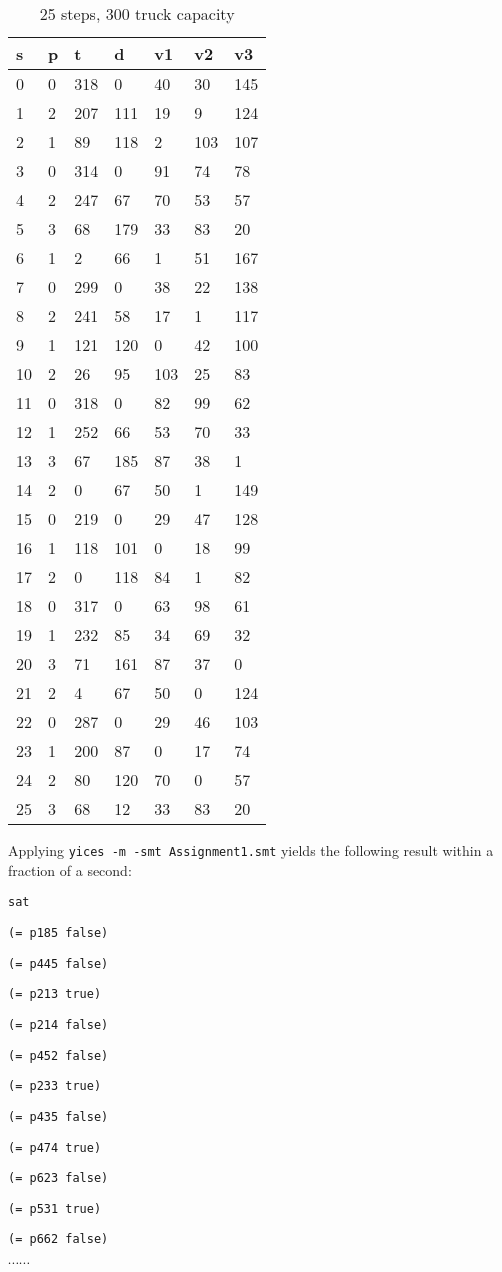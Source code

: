\documentclass[a4paper]{article}
\begin{document}
	\begin{longtable}[c]{@{}|l|l|l|l|l|l|l|@{}}
		\caption{25 steps, 300 truck capacity}\\
		\toprule
		s & p & t & d & v1 & v2 & v3\tabularnewline
		\midrule
		\endhead
		0 & 0 & 318 & 0 & 40 & 30 & 145\tabularnewline
		1 & 2 & 207 & 111 & 19 & 9 & 124\tabularnewline
		2 & 1 & 89 & 118 & 2 & 103 & 107\tabularnewline
		3 & 0 & 314 & 0 & 91 & 74 & 78\tabularnewline
		4 & 2 & 247 & 67 & 70 & 53 & 57\tabularnewline
		5 & 3 & 68 & 179 & 33 & 83 & 20\tabularnewline
		6 & 1 & 2 & 66 & 1 & 51 & 167\tabularnewline
		7 & 0 & 299 & 0 & 38 & 22 & 138\tabularnewline
		8 & 2 & 241 & 58 & 17 & 1 & 117\tabularnewline
		9 & 1 & 121 & 120 & 0 & 42 & 100\tabularnewline
		10 & 2 & 26 & 95 & 103 & 25 & 83\tabularnewline
		11 & 0 & 318 & 0 & 82 & 99 & 62\tabularnewline
		12 & 1 & 252 & 66 & 53 & 70 & 33\tabularnewline
		13 & 3 & 67 & 185 & 87 & 38 & 1\tabularnewline
		14 & 2 & 0 & 67 & 50 & 1 & 149\tabularnewline
		15 & 0 & 219 & 0 & 29 & 47 & 128\tabularnewline
		16 & 1 & 118 & 101 & 0 & 18 & 99\tabularnewline
		17 & 2 & 0 & 118 & 84 & 1 & 82\tabularnewline
		18 & 0 & 317 & 0 & 63 & 98 & 61\tabularnewline
		19 & 1 & 232 & 85 & 34 & 69 & 32\tabularnewline
		20 & 3 & 71 & 161 & 87 & 37 & 0\tabularnewline
		21 & 2 & 4 & 67 & 50 & 0 & 124\tabularnewline
		22 & 0 & 287 & 0 & 29 & 46 & 103\tabularnewline
		23 & 1 & 200 & 87 & 0 & 17 & 74\tabularnewline
		24 & 2 & 80 & 120 & 70 & 0 & 57\tabularnewline
		25 & 3 & 68 & 12 & 33 & 83 & 20\tabularnewline
		\bottomrule
	\end{longtable}

Applying {\tt yices -m -smt Assignment1.smt} yields the following result
within a fraction of a second:

{\footnotesize

{\tt sat }

{\tt (= p185 false)}

{\tt (= p445 false)}

{\tt (= p213 true)}

{\tt (= p214 false)}

{\tt (= p452 false)}

{\tt (= p233 true)}

{\tt (= p435 false)}

{\tt (= p474 true)}

{\tt (= p623 false)}

{\tt (= p531 true)}

{\tt (= p662 false)}

$\cdots \cdots$ }
\end{document}
